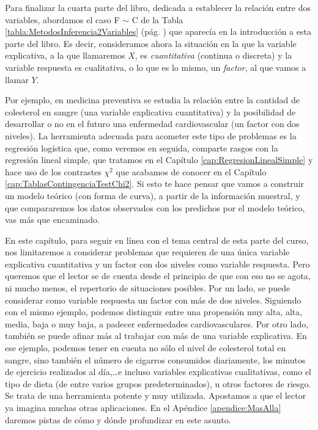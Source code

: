 
Para finalizar la cuarta parte del libro, dedicada a establecer la relación entre dos variables,
abordamos el caso F $\sim$ C de la Tabla \ref{tabla:MetodosInferencia2Variables} (pág.
\pageref{tabla:MetodosInferencia2Variables}) que aparecía en  la introducción a esta parte del libro. Es decir,
consideramos ahora la situación en la que la variable explicativa, a la que llamaremos $X$, es {\em
cuantitativa} (continua o discreta) y la variable respuesta es cualitativa, o lo que es lo mismo,
un \emph{factor}, al que vamos a llamar $Y$.

Por ejemplo, en medicina preventiva se estudia la relación entre la cantidad de colesterol en sangre (una variable explicativa cuantitativa) y la posibilidad de desarrollar o no en el futuro una enfermedad cardiovascular (un factor con dos niveles).
La herramienta adecuada para acometer este tipo de problemas es \textsf{la regresión logística}
 que,
como veremos en seguida, comparte rasgos con la regresión lineal simple, que tratamos
en el Cap\'itulo \ref{cap:RegresionLinealSimple} y hace uso de los contrastes $\chi^2$
que acabamos de conocer en el Cap\'itulo \ref{cap:TablasContingenciaTestChi2}.
Si esto te hace pensar que vamos a construir un modelo
teórico (con forma de curva), a partir de la información muestral, y que compararemos los datos observados con los predichos por el modelo teórico, vas más que encaminado.

En este capítulo, para seguir en línea con el tema central de esta parte del curso, nos limitaremos a considerar problemas que requieren de una única variable explicativa cuantitativa y un factor con dos niveles como variable respuesta.  Pero queremos que el lector se de cuenta desde el principio de que con eso no se agota, ni mucho menos, el repertorio de situaciones posibles. Por un lado, se puede considerar como variable respuesta un factor con más de dos niveles. Siguiendo con el mismo ejemplo,
podemos distinguir entre una propensión muy alta, alta, media, baja o muy baja, a padecer enfermedades cardiovasculares. Por otro lado, también se puede afinar más al trabajar con más de una variable explicativa. En ese  ejemplo, podemos tener en cuenta no sólo el nivel de colesterol total en sangre, sino también el número de cigarros consumidos diariamente, los minutos de ejercicio realizados al día,\ldots e incluso variables explicativas cualitativas, como el tipo de dieta (de entre varios grupos predeterminados), u otros factores de riesgo. Se trata de una herramienta potente y muy utilizada. Apostamos a que el lector ya imagina muchas otras aplicaciones. En el Apéndice \ref{apendice:MasAlla} daremos pistas de c\'omo y d\'onde profundizar en este asunto.

